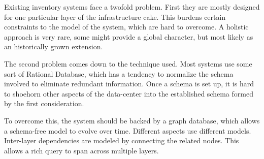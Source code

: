 Existing inventory systems face a twofold problem. First they are mostly designed for one particular layer of the infrastructure cake.
This burdens certain constraints to the model of the system, which are hard to overcome. A holistic approach is very rare, some might
provide a global character, but most likely as an historically grown extension.

The second problem comes down to the technique used. Most systems use some sort of Rational Database, which has a tendency to normalize
the schema involved to eliminate redundant information. Once a schema is set up, it is hard to shoehorn other aspects of the data-center into
the established schema formed by the first consideration.

To overcome this, the system should be backed by a graph database, which allows a schema-free model to evolve over time. Different aspects
use different models. Inter-layer dependencies are modeled by connecting the related nodes. This allows a rich query to span across multiple layers.
